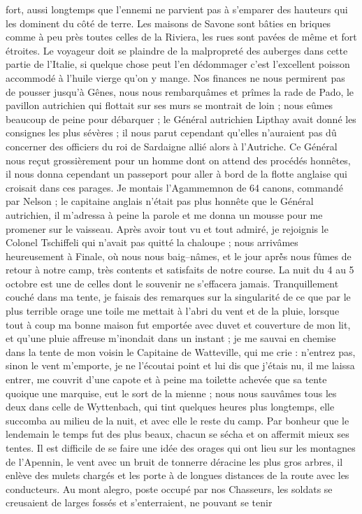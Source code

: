 \documentclass[12pt]{article}
\begin{document}
 fort, aussi longtemps que l’ennemi ne parvient pas à
s’emparer des hauteurs qui les dominent du côté de terre. Les maisons de Savone sont bâties en
briques comme à peu près toutes celles de la Riviera, les rues sont pavées de même et fort étroites.
Le voyageur doit se plaindre de la malpropreté des auberges dans cette partie de l’Italie, si
quelque chose peut l’en dédommager c’est l’excellent poisson accommodé à l’huile vierge qu’on y
mange. Nos finances ne nous permirent pas de pousser jusqu’à Gênes, nous nous rembarquâmes et prîmes
la rade de Pado, le pavillon autrichien qui flottait sur ses murs se montrait de loin ; nous eûmes
beaucoup de peine pour débarquer ; le Général autrichien Lipthay avait donné les consignes les plus
sévères ; il nous parut cependant qu’elles n’auraient pas dû concerner des officiers du roi de
Sardaigne allié alors à l’Autriche. Ce Général nous reçut grossièrement pour un homme dont on attend
des procédés honnêtes, il nous donna cependant un passeport pour aller à bord de la flotte anglaise
qui croisait dans ces parages. Je montais l’Agammemnon de 64 canons, commandé par Nelson ; le
capitaine anglais n’était pas plus honnête que le Général autrichien, il m’adressa à peine la parole
et me donna un mousse pour me promener sur le vaisseau. Après avoir tout vu et tout admiré, je
rejoignis le Colonel Tschiffeli qui n’avait pas quitté la chaloupe ; nous arrivâmes heureusement à
Finale, où nous nous baig–nâmes, et le jour aprè́s nous fûmes de retour à notre camp, très contents
et satisfaits de notre course. La nuit du 4 au 5 octobre est une de celles dont le souvenir ne
s’effacera jamais. Tranquillement couché dans ma tente, je faisais des remarques sur la singularité
de ce que par le plus terrible orage une toile me mettait à l’abri du vent et de la pluie, lorsque
tout à coup ma bonne maison fut emportée avec duvet et couverture de mon lit, et qu’une pluie
affreuse m’inondait dans un instant ; je me sauvai en chemise dans la tente de mon voisin le
Capitaine de Watteville, qui me crie : n’entrez pas, sinon le vent m’emporte, je ne l’écoutai point
et lui dis que j’étais nu, il me laissa entrer, me couvrit d’une capote et à peine ma toilette
achevée que sa tente quoique une marquise, eut le sort de la mienne ; nous nous sauvâmes tous les
deux dans celle de Wyttenbach, qui tint quelques heures plus longtemps, elle succomba au milieu de
la nuit, et avec elle le reste du camp. Par bonheur que le lendemain le temps fut des plus beaux,
chacun se sécha et on affermit mieux ses tentes. Il est difficile de se faire une idée des orages
qui ont lieu sur les montagnes de l’Apennin, le vent avec un bruit de tonnerre déracine les plus
gros arbres, il enlève des mulets chargés et les porte à de longues distances de la route avec les
conducteurs. Au mont alegro, poste occupé par nos Chasseurs, les soldats se creusaient de larges
fossés et s’enterraient, ne pouvant se tenir
\end{document}
